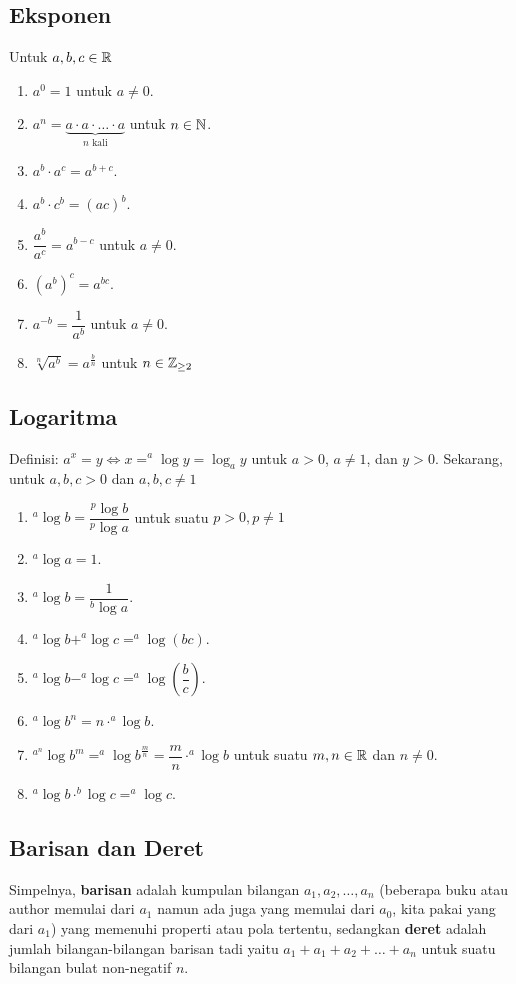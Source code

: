 \subsection{Eksponen}
Untuk $a,b,c \in \mathbb R$
\begin{enumerate}
    \item $a^0=1$ untuk $a \neq 0$.
    \item $a^n =  \underbrace{a \cdot a \cdot \ldots \cdot a}_{n \text{ kali}}$ untuk $n \in \mathbb N$.
    \item $a^b\cdot a^c=a^{b+c}$.
    \item $a^b\cdot c^b = (ac)^b$.
    \item $\dfrac{a^b}{a^c}=a^{b-c}$ untuk $a\neq 0$.
    \item $(a^b)^c=a^{bc}$.
    \item $a^{-b} = \dfrac{1}{a^b}$ untuk $a \neq 0$.
    \item $\sqrt[n]{a^b}=a^{\frac{b}{n}}$ untuk $n \in \mathbb Z_{\ge 2}$
\end{enumerate}

\subsection{Logaritma}
Definisi: $a^x =y \iff x = ^a \log y = \log_a y$ untuk $a> 0$, $a \neq 1$, dan $y >0$.
Sekarang, untuk $a,b,c > 0$ dan $a,b,c \neq 1$
\begin{enumerate}
    \item $^a \log b = \dfrac{^p \log b}{^p \log a}$ untuk suatu $p>0, p \neq 1$
    \item $^a \log a = 1$.
    \item $^a \log b = \dfrac{1}{^b \log a}$.
    \item $^a \log b + ^a \log c = ^a \log (bc)$.
    \item $^a \log b - ^a \log c = ^a \log \left(\dfrac{b}{c}\right)$.
    \item $^a \log b^n = n \cdot ^a \log b$.
    \item $^{a^n} \log b^m = ^a \log b^{\frac{m}{n}} = \dfrac{m}{n}\cdot ^a \log b$ untuk suatu $m,n \in \mathbb R$ dan $n \neq 0$.
    \item $^a \log b \cdot ^b\log c = ^a \log c$.
\end{enumerate}

\subsection{Barisan dan Deret}
Simpelnya, \textbf{barisan} adalah kumpulan bilangan $a_1,a_2,\dots,a_n$ (beberapa buku atau author memulai dari $a_1$ namun ada juga yang memulai dari $a_0$, kita pakai yang dari $a_1$) yang memenuhi properti atau pola tertentu, sedangkan \textbf{deret} adalah jumlah bilangan-bilangan barisan tadi yaitu $a_1+a_1+a_2+\dots+a_n$ untuk suatu bilangan bulat non-negatif $n$.

